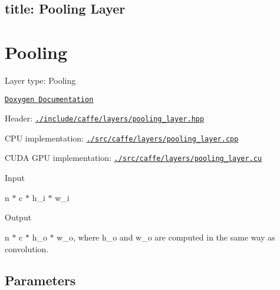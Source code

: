 

 \subsection*{title\+: Pooling Layer }

\section*{Pooling}


\begin{DoxyItemize}
\item Layer type\+: {\ttfamily Pooling}
\item \href{http://caffe.berkeleyvision.org/doxygen/classcaffe_1_1PoolingLayer.html}{\tt Doxygen Documentation}
\item Header\+: \href{https://github.com/BVLC/caffe/blob/master/include/caffe/layers/pooling_layer.hpp}{\tt {\ttfamily ./include/caffe/layers/pooling\+\_\+layer.hpp}}
\item C\+PU implementation\+: \href{https://github.com/BVLC/caffe/blob/master/src/caffe/layers/pooling_layer.cpp}{\tt {\ttfamily ./src/caffe/layers/pooling\+\_\+layer.cpp}}
\item C\+U\+DA G\+PU implementation\+: \href{https://github.com/BVLC/caffe/blob/master/src/caffe/layers/pooling_layer.cu}{\tt {\ttfamily ./src/caffe/layers/pooling\+\_\+layer.cu}}
\item Input
\begin{DoxyItemize}
\item {\ttfamily n $\ast$ c $\ast$ h\+\_\+i $\ast$ w\+\_\+i}
\end{DoxyItemize}
\item Output
\begin{DoxyItemize}
\item {\ttfamily n $\ast$ c $\ast$ h\+\_\+o $\ast$ w\+\_\+o}, where h\+\_\+o and w\+\_\+o are computed in the same way as convolution.
\end{DoxyItemize}
\end{DoxyItemize}

\subsection*{Parameters}


